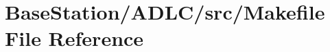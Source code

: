 \hypertarget{BaseStation_2ADLC_2src_2Makefile}{\section{Base\-Station/\-A\-D\-L\-C/src/\-Makefile File Reference}
\label{BaseStation_2ADLC_2src_2Makefile}
}
